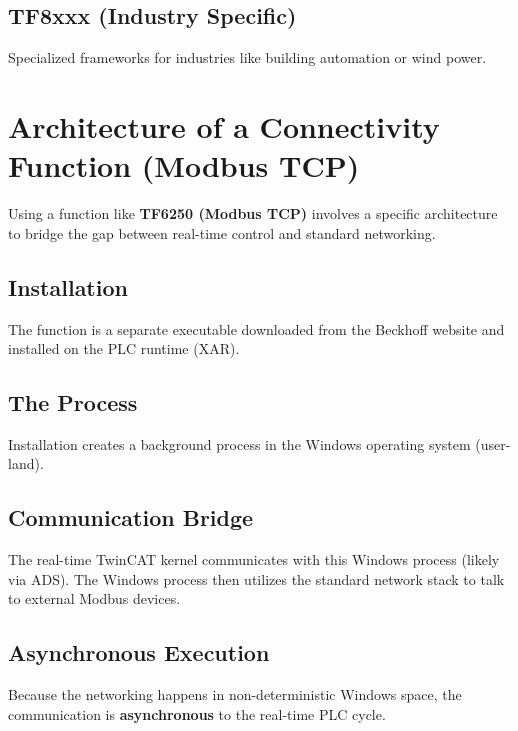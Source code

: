 \documentclass[11pt,a4paper]{article}
\begin{document}
\subsection{TF8xxx (Industry Specific)}
Specialized frameworks for industries like building automation or wind power.

\section{Architecture of a Connectivity Function (Modbus TCP)}

Using a function like \textbf{TF6250 (Modbus TCP)} involves a specific architecture to bridge the gap between real-time control and standard networking.

\subsection{Installation}
The function is a separate executable downloaded from the Beckhoff website and installed on the PLC runtime (XAR).

\subsection{The Process}
Installation creates a background process in the Windows operating system (user-land).

\subsection{Communication Bridge}
The real-time TwinCAT kernel communicates with this Windows process (likely via ADS). The Windows process then utilizes the standard network stack to talk to external Modbus devices.

\subsection{Asynchronous Execution}
Because the networking happens in non-deterministic Windows space, the communication is \textbf{asynchronous} to the real-time PLC cycle.
\end{document}
